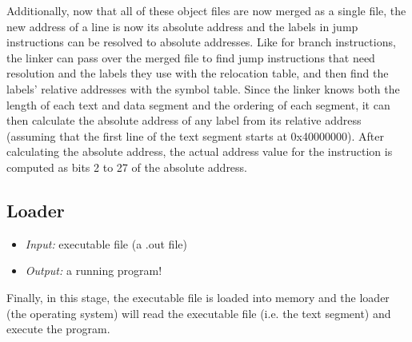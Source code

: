 \documentclass{article}
\begin{document}
Additionally, now that all of these object files are now merged as a single file, the new address of a line is now its absolute address and the labels in jump instructions can be resolved to absolute addresses. Like for branch instructions, the linker can pass over the merged file to find jump instructions that need resolution and the labels they use with the relocation table, and then find the labels' relative addresses with the symbol table. Since the linker knows both the length of each text and data segment and the ordering of each segment, it can then calculate the absolute address of any label from its relative address (assuming that the first line of the text segment starts at 0x40000000). After calculating the absolute address, the actual address value for the instruction is computed as bits 2 to 27 of the absolute address.
\subsection{Loader}
\begin{itemize}
\item \textit{Input:} executable file (a .out file)
\item \textit{Output:} a running program!
\end{itemize}
Finally, in this stage, the executable file is loaded into memory and the loader (the operating system) will read the executable file (i.e. the text segment) and execute the program.
\end{document}
